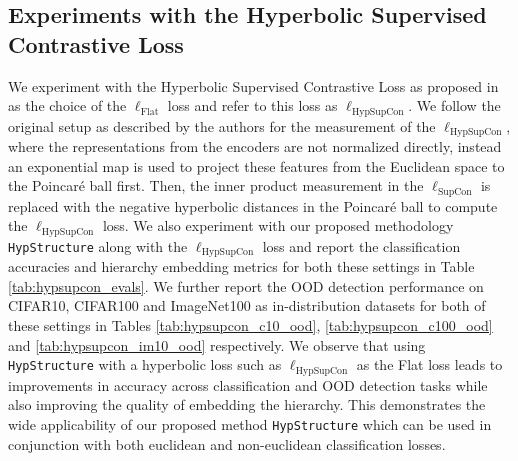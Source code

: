\subsection{Experiments with the Hyperbolic Supervised Contrastive Loss}
\label{app:sec_hypsupcon}

We experiment with the Hyperbolic Supervised Contrastive Loss as proposed in \citep{ge2022hyperbolic} 
as the choice of the $\ell_\text{Flat}$ loss and refer to this loss as $\ell_\text{HypSupCon}$. We follow the original setup as described by the authors for the measurement of the $\ell_\text{HypSupCon}$, where the 
representations from the encoders are not normalized directly, instead an exponential map is used to project these features from the Euclidean space to the Poincaré ball first. Then, the inner product measurement in the $\ell_\text{SupCon}$ is replaced with the negative hyperbolic distances in the Poincaré ball to compute the $\ell_\text{HypSupCon}$ loss. We also experiment with our proposed methodology \texttt{HypStructure} along with the $\ell_\text{HypSupCon}$ loss and report the classification accuracies and hierarchy embedding metrics for both these settings in Table \ref{tab:hypsupcon_evals}. We further report the OOD detection performance on CIFAR10, CIFAR100 and ImageNet100 as in-distribution datasets for both of these settings in Tables \ref{tab:hypsupcon_c10_ood}, \ref{tab:hypsupcon_c100_ood} and \ref{tab:hypsupcon_im10_ood} respectively. We observe that using \texttt{HypStructure} with a hyperbolic loss such as $\ell_\text{HypSupCon}$ as the Flat loss leads to improvements in accuracy across classification and OOD detection tasks while also improving the quality of embedding the hierarchy. This demonstrates the wide applicability of our proposed method \texttt{HypStructure} which can be used in conjunction with both euclidean and non-euclidean classification losses. 


